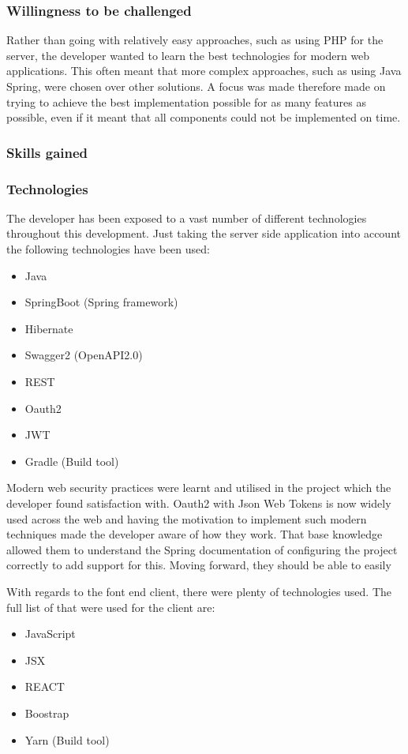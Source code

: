 \subsubsection*{Willingness to be challenged}
Rather than going with relatively easy approaches, such as using PHP for the server, the developer wanted to learn the best technologies for modern web applications.
This often meant that more complex approaches, such as using Java Spring, were chosen over other solutions.
A focus was made therefore made on trying to achieve the best implementation possible for as many features as possible, even if it meant that all components 
could not be implemented on time.


\subsubsection{Skills gained}

\subsubsection*{Technologies}
The developer has been exposed to a vast number of different technologies throughout this development.
Just taking the server side application into account the following technologies have been used:
\begin{itemize}
    \tightlist
    \item Java
    \item SpringBoot (Spring framework)
    \item Hibernate
    \item Swagger2 (OpenAPI2.0)
    \item REST
    \item Oauth2 
    \item JWT
    \item Gradle (Build tool)
\end{itemize}

Modern web security practices were learnt and utilised in the project which the developer found satisfaction with.
Oauth2 with Json Web Tokens is now widely used across the web and having the motivation to implement such modern techniques made the developer aware 
of how they work.
That base knowledge allowed them to understand the Spring documentation of configuring the project correctly to add support for this.
Moving forward, they should be able to easily 

With regards to the font end client, there were plenty of technologies used.
The full list of that were used for the client are: 
\begin{itemize}
    \tightlist
    \item JavaScript
    \item JSX
    \item REACT
    \item Boostrap
    \item Yarn (Build tool)
\end{itemize}

